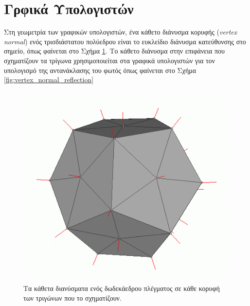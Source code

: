 \section*{Γρφικά Υπολογιστών}
\label{appendix:computer_graphics}


\begin{definition}
\label{definition:vertex_normal}
 
 Στη γεωμετρία των γραφικών υπολογιστών, ένα κάθετο διάνυσμα κορυφής (\textsl{vertex normal}) ενός τρισδιάστατου πολύεδρου είναι το ευκλείδιο διάνυσμα κατεύθυνσης στο σημείο, όπως φαίνεται στο Σχήμα \ref{fig:vertex_normal}. Το κάθετο διάνυσμα στην επιφάνεια που σχηματίζουν τα τρίγωνα χρησιμοποιείται στα γραφικά υπολογιστών για τον υπολογισμό της αντανάκλασης του φωτός όπως φαίνεται στο Σχήμα \ref{fig:vertex_normal_reflection}

\begin{figure}[h]
\label{fig:vertex_normal}	
\centering
\includegraphics[scale=0.2]{images/appendix/vertex_normal.png}
\caption[Κάθετα διανύσματα κορυφών πολύεδρου]{Τα κάθετα διανύσματα ενός δωδεκάεδρου πλέγματος σε κάθε κορυφή των τριγώνων που το σχηματίζουν.}
\end{figure}


\end{definition}
